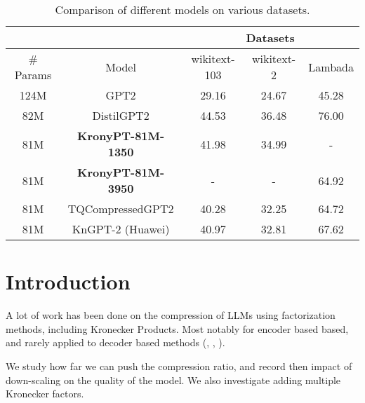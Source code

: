 \documentclass{article}
\begin{document}
\begin{table}[h]
\centering
\begin{tabular}{|c|c|c|c|c|}
\hline

 & & \multicolumn{3}{c|}{Datasets} \\ \hline
\# Params &  Model            & wikitext-103 & wikitext-2 & Lambada \\ \hline
124M      & GPT2              & 29.16        & 24.67      & 45.28      \\ \hline
82M       & DistilGPT2        & 44.53        & 36.48      & 76.00      \\ \hline
81M       & \textbf{KronyPT-81M-1350}  & 41.98        & 34.99      & -          \\ \hline
81M       & \textbf{KronyPT-81M-3950}  & -            & -          & 64.92      \\ \hline
81M       & TQCompressedGPT2  & 40.28        & 32.25      & 64.72      \\ \hline
81M       & KnGPT-2 (Huawei)  & 40.97        & 32.81      & 67.62      \\ \hline
\end{tabular}
\caption{Comparison of different models on various datasets.}
\end{table}



\section{Introduction}
\label{sec:Introduction}


A lot of work has been done on the compression of LLMs using factorization methods, including Kronecker Products. Most notably for encoder based based, and rarely applied to decoder based methods (\cite{tahaei2022kroneckerbert}, \cite{edalati2021kroneckr}, \cite{abronin2024tqcompressor}).


We study how far we can push the compression ratio, and record then impact of down-scaling on the quality of the model. We also investigate adding multiple Kronecker factors.
\end{document}
